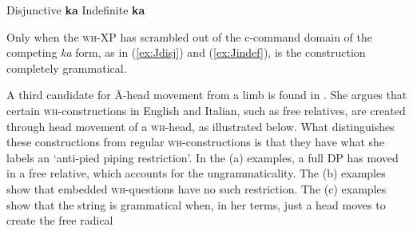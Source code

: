 \documentclass[output=paper,colorlinks,citecolor=brown,
]{langscibook}
\begin{document}
\ea Disjunctive \textbf{ka} \label{ex:disjunctiveka}
\z
\ex Indefinite \textbf{ka} \label{ex:indefiniteka}
\z
\z

Only when the \textsc{wh}-XP has scrambled out of the c-command domain of the competing \textit{ka} form, as in (\ref{ex:Jdisj}) and (\ref{ex:Jindef}), is the construction completely grammatical.

A third candidate for \=A-head movement from a limb is found in \citet{Donati:2006}.  She argues that certain \textsc{wh}-constructions in English and Italian, such as free relatives, are created through head movement of a \textsc{wh}-head, as illustrated below.  What distinguishes these constructions from regular \textsc{wh}-constructions is that they have what she labels an `anti-pied piping restriction'.  In the (a) examples, a full DP has moved in a free relative, which accounts for the ungrammaticality.  The (b) examples show that embedded \textsc{wh}-questions have no such restriction. The (c) examples show that the string is grammatical when, in her terms, just a head moves to create the free radical

\ea 
{}
\z
\ex 
    \z
\z
\end{document}
